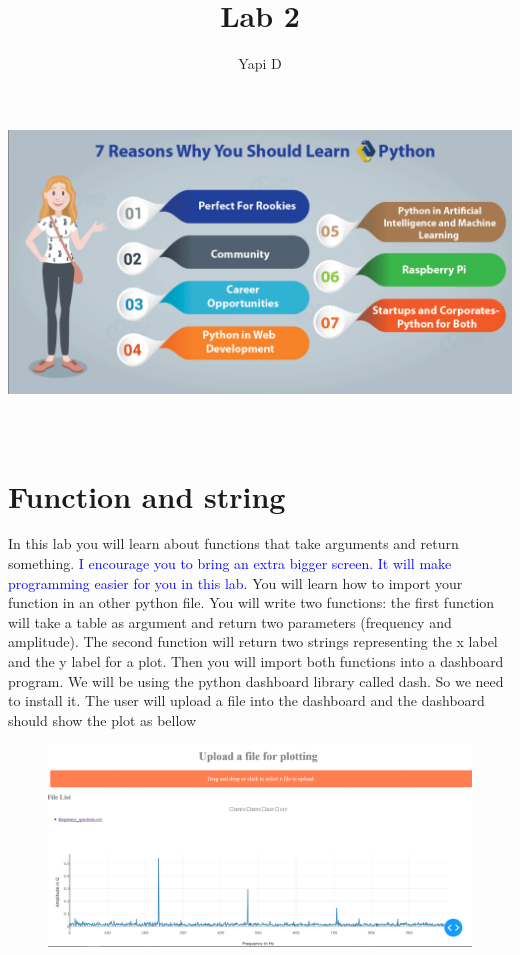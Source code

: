 \documentclass[10pt,a4paper,titlepage]{article}
\author{Yapi D}
\title{Lab 2}
\begin{document}
	\makeatletter
\begin{titlepage}
	\begin{center}
		\includegraphics[width=1\linewidth]{pylogo}\\[4ex]
		{\huge \bfseries  \@title }\\[2ex] 
		{\LARGE  \@author}\\[50ex] 
		{\large \@date}
	\end{center}
\end{titlepage}
\makeatother
\thispagestyle{empty}
\newpage

	




\section{Function and string}
In this lab you will learn about functions that take arguments and return something. \textcolor{blue}{I encourage you to bring an extra bigger screen. It will make programming easier for you in this lab}.
\justify
You will learn how to import your function in an other python file. You will write two functions: the first function will take a table as argument and return two parameters (frequency and amplitude).
\justify
 The second function will return two strings representing the x label and the y label for a plot. Then you will import both functions into a dashboard program. We will be using the python dashboard library called dash. So we need to install it.
The user will upload a file into the dashboard and the dashboard should show the plot as bellow 
\begin{figure}[H]
	\centering
	\includegraphics[width=1.5\linewidth]{dashboard}
\end{figure}
\justify
 
\end{document}
